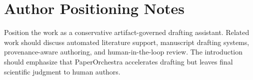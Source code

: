 \section{Author Positioning Notes}
Position the work as a conservative artifact-governed drafting assistant. Related work should discuss automated literature support, manuscript drafting systems, provenance-aware authoring, and human-in-the-loop review. The introduction should emphasize that PaperOrchestra accelerates drafting but leaves final scientific judgment to human authors.
